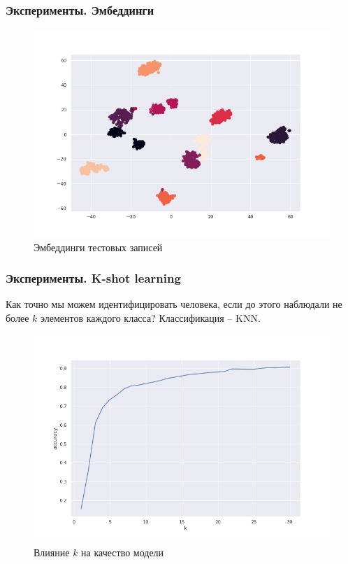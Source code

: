 \documentclass[11pt]{beamer}
\begin{document}
\begin{frame}
\frametitle{Эксперименты. Эмбеддинги}

\begin{figure}[htp]
\centering
\includegraphics[scale=0.40]{test_emb.png}
\caption{Эмбеддинги тестовых записей}
\label{}
\end{figure}

\end{frame}

\begin{frame}
\frametitle{Эксперименты. K-shot learning}

Как точно мы можем идентифицировать человека, если до этого наблюдали не более $k$ элементов каждого класса? Классификация -- KNN.

\begin{figure}[htp]
\centering
\includegraphics[scale=0.32]{k-shot.png}
\caption{Влияние $k$ на качество модели}
\label{}
\end{figure}

\end{frame}
\end{document}
